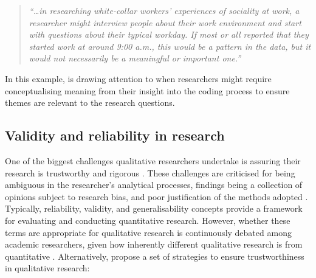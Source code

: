 \begin{quote}
\textit{``…in researching white-collar workers’ experiences of sociality at work, a researcher might interview people about their work environment and start with questions about their typical workday. If most or all reported that they started work at around 9:00 a.m., this would be a pattern in the data, but it would not necessarily be a meaningful or important one.''} \citep[pg. 37]{braun2012thematic}
\end{quote}
In this example, \cite{byrne2021worked} is drawing attention to when researchers might require conceptualising meaning from their insight into the coding process to ensure themes are relevant to the research questions.

\subsection{Validity and reliability in research}
\label{TA:Reliability}
One of the biggest challenges qualitative researchers undertake is assuring their research is trustworthy and rigorous \citep{finlay2006rigour}. These challenges are criticised for being ambiguous in the researcher's analytical processes, findings being a collection of opinions subject to research bias, and poor justification of the methods adopted \citep{rolfe2006validity}. Typically, reliability, validity, and generalisability concepts provide a framework for evaluating and conducting quantitative research. However, whether these terms are appropriate for qualitative research is continuously debated among academic researchers, given how inherently different qualitative research is from quantitative \citep{ryan2009rigour}. Alternatively, \cite{noble2015issues} propose a set of strategies to ensure trustworthiness in qualitative research:

